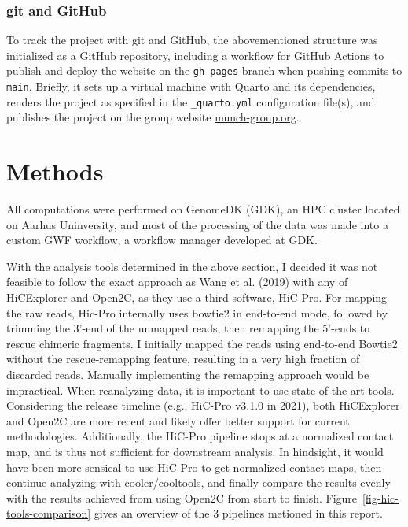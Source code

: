 \documentclass[
  11pt,
  a4paper,
]{scrbook}
\begin{document}
\subsection{git and GitHub}\label{git-and-github}

To track the project with git and GitHub, the abovementioned structure
was initialized as a GitHub repository, including a workflow for GitHub
Actions to publish and deploy the website on the \texttt{gh-pages}
branch when pushing commits to \texttt{main}. Briefly, it sets up a
virtual machine with Quarto and its dependencies, renders the project as
specified in the \texttt{\_quarto.yml} configuration file(s), and
publishes the project on the group website
\href{https://munch-group.org/hic-spermatogenesis}{munch-group.org}.

\chapter{Methods}\label{methods}

All computations were performed on GenomeDK (GDK), an HPC cluster
located on Aarhus Uninversity, and most of the processing of the data
was made into a custom GWF workflow, a workflow manager developed at
GDK.

With the analysis tools determined in the above section, I decided it
was not feasible to follow the exact approach as Wang et al. (2019) with
any of HiCExplorer and Open2C, as they use a third software, HiC-Pro.
For mapping the raw reads, Hic-Pro internally uses bowtie2 in end-to-end
mode, followed by trimming the 3'-end of the unmapped reads, then
remapping the 5'-ends to rescue chimeric fragments. I initially mapped
the reads using end-to-end Bowtie2 without the rescue-remapping feature,
resulting in a very high fraction of discarded reads. Manually
implementing the remapping approach would be impractical. When
reanalyzing data, it is important to use state-of-the-art tools.
Considering the release timeline (e.g., HiC-Pro v3.1.0 in 2021), both
HiCExplorer and Open2C are more recent and likely offer better support
for current methodologies. Additionally, the HiC-Pro pipeline stops at a
normalized contact map, and is thus not sufficient for downstream
analysis. In hindsight, it would have been more sensical to use HiC-Pro
to get normalized contact maps, then continue analyzing with
cooler/cooltools, and finally compare the results evenly with the
results achieved from using Open2C from start to finish.
Figure~\ref{fig-hic-tools-comparison} gives an overview of the 3
pipelines metioned in this report.
\end{document}
